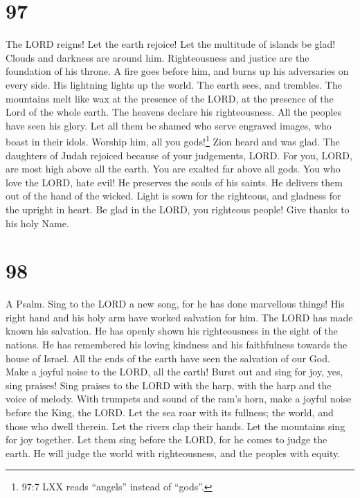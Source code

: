 \hypertarget{section-89}{%
\section{97}\label{section-89}}

 The LORD reigns! Let the earth rejoice! Let the multitude
of islands be glad!  Clouds and darkness are around him.
Righteousness and justice are the foundation of his throne. 
A fire goes before him, and burns up his adversaries on every side.
 His lightning lights up the world. The earth sees, and
trembles.  The mountains melt like wax at the presence of
the LORD, at the presence of the Lord of the whole earth. 
The heavens declare his righteousness. All the peoples have seen his
glory.  Let all them be shamed who serve engraved images,
who boast in their idols. Worship him, all you gods!\footnote{97:7 LXX
  reads ``angels'' instead of ``gods''.}  Zion heard and was
glad. The daughters of Judah rejoiced because of your judgements, LORD.
 For you, LORD, are most high above all the earth. You are
exalted far above all gods.  You who love the LORD, hate
evil! He preserves the souls of his saints. He delivers them out of the
hand of the wicked.  Light is sown for the righteous, and
gladness for the upright in heart.  Be glad in the LORD,
you righteous people! Give thanks to his holy Name.

\hypertarget{section-90}{%
\section{98}\label{section-90}}

A Psalm.  Sing to the LORD a new song, for he has done
marvellous things! His right hand and his holy arm have worked salvation
for him.  The LORD has made known his salvation. He has
openly shown his righteousness in the sight of the nations. 
He has remembered his loving kindness and his faithfulness towards the
house of Israel. All the ends of the earth have seen the salvation of
our God.  Make a joyful noise to the LORD, all the earth!
Burst out and sing for joy, yes, sing praises!  Sing praises
to the LORD with the harp, with the harp and the voice of melody.
 With trumpets and sound of the ram's horn, make a joyful
noise before the King, the LORD.  Let the sea roar with its
fullness; the world, and those who dwell therein.  Let the
rivers clap their hands. Let the mountains sing for joy together.
 Let them sing before the LORD, for he comes to judge the
earth. He will judge the world with righteousness, and the peoples with
equity.

